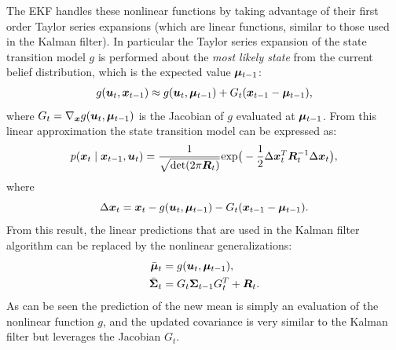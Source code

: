 The EKF handles these nonlinear functions by taking advantage of their first order Taylor series expansions (which are linear functions, similar to those used in the Kalman filter). In particular the Taylor series expansion of the state transition model $g$ is performed about the \textit{most likely state} from the current belief distribution, which is the expected value $\bm{\mu}_{t-1}$:
\begin{equation*}
\begin{split}
g(\bm{u}_t, \bm{x}_{t-1}) &\approx g(\bm{u}_t, \bm{\mu}_{t-1}) + G_t (\bm{x}_{t-1}-\bm{\mu}_{t-1}), \\
\end{split}
\end{equation*}
where $G_t = \nabla_{\bm{x}} g(\bm{u}_t, \bm{\mu}_{t-1})$ is the Jacobian of $g$ evaluated at $\bm{\mu}_{t-1}$. From this linear approximation the state transition model can be expressed as:
\begin{equation*}
p(\bm{x}_t \mid \bm{x}_{t-1}, \bm{u}_t) = \frac{1}{\sqrt{\text{det}(2\pi \bm{R}_t)}} \text{exp}\big( -\frac{1}{2}\Delta \bm{x}_t^T \bm{R}_t^{-1} \Delta \bm{x}_t \big),
\end{equation*}
where
\begin{equation*}
\Delta \bm{x}_t = \bm{x}_t-g(\bm{u}_t, \bm{\mu}_{t-1}) - G_t (\bm{x}_{t-1}-\bm{\mu}_{t-1}).
\end{equation*}
From this result, the linear predictions that are used in the Kalman filter algorithm can be replaced by the nonlinear generalizations:
\begin{equation*}
\begin{split}
\bar{\bm{\mu}}_t &= g(\bm{u}_t,\bm{\mu}_{t-1}), \\
\bar{\bm{\Sigma}}_t &= G_t\bm{\Sigma}_{t-1} G_t^{T} + \bm{R}_t.
\end{split}
\end{equation*}
As can be seen the prediction of the new mean is simply an evaluation of the nonlinear function $g$, and the updated covariance is very similar to the Kalman filter but leverages the Jacobian $G_t$.

